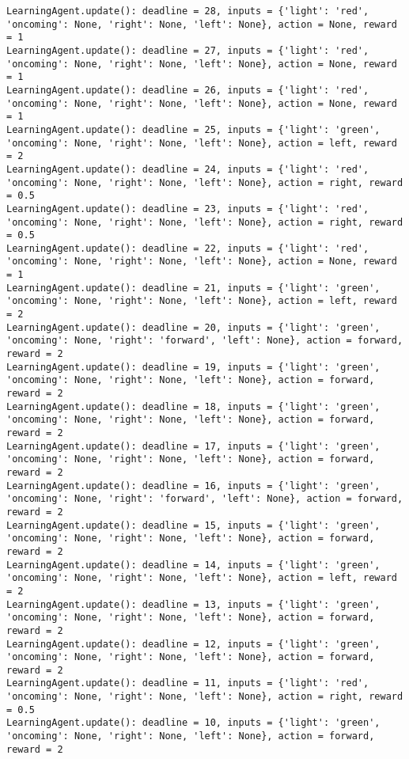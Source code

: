 \documentclass{article}
\begin{document}
\begin{verbatim}
LearningAgent.update(): deadline = 28, inputs = {'light': 'red', 'oncoming': None, 'right': None, 'left': None}, action = None, reward = 1
LearningAgent.update(): deadline = 27, inputs = {'light': 'red', 'oncoming': None, 'right': None, 'left': None}, action = None, reward = 1
LearningAgent.update(): deadline = 26, inputs = {'light': 'red', 'oncoming': None, 'right': None, 'left': None}, action = None, reward = 1
LearningAgent.update(): deadline = 25, inputs = {'light': 'green', 'oncoming': None, 'right': None, 'left': None}, action = left, reward = 2
LearningAgent.update(): deadline = 24, inputs = {'light': 'red', 'oncoming': None, 'right': None, 'left': None}, action = right, reward = 0.5
LearningAgent.update(): deadline = 23, inputs = {'light': 'red', 'oncoming': None, 'right': None, 'left': None}, action = right, reward = 0.5
LearningAgent.update(): deadline = 22, inputs = {'light': 'red', 'oncoming': None, 'right': None, 'left': None}, action = None, reward = 1
LearningAgent.update(): deadline = 21, inputs = {'light': 'green', 'oncoming': None, 'right': None, 'left': None}, action = left, reward = 2
LearningAgent.update(): deadline = 20, inputs = {'light': 'green', 'oncoming': None, 'right': 'forward', 'left': None}, action = forward, reward = 2
LearningAgent.update(): deadline = 19, inputs = {'light': 'green', 'oncoming': None, 'right': None, 'left': None}, action = forward, reward = 2
LearningAgent.update(): deadline = 18, inputs = {'light': 'green', 'oncoming': None, 'right': None, 'left': None}, action = forward, reward = 2
LearningAgent.update(): deadline = 17, inputs = {'light': 'green', 'oncoming': None, 'right': None, 'left': None}, action = forward, reward = 2
LearningAgent.update(): deadline = 16, inputs = {'light': 'green', 'oncoming': None, 'right': 'forward', 'left': None}, action = forward, reward = 2
LearningAgent.update(): deadline = 15, inputs = {'light': 'green', 'oncoming': None, 'right': None, 'left': None}, action = forward, reward = 2
LearningAgent.update(): deadline = 14, inputs = {'light': 'green', 'oncoming': None, 'right': None, 'left': None}, action = left, reward = 2
LearningAgent.update(): deadline = 13, inputs = {'light': 'green', 'oncoming': None, 'right': None, 'left': None}, action = forward, reward = 2
LearningAgent.update(): deadline = 12, inputs = {'light': 'green', 'oncoming': None, 'right': None, 'left': None}, action = forward, reward = 2
LearningAgent.update(): deadline = 11, inputs = {'light': 'red', 'oncoming': None, 'right': None, 'left': None}, action = right, reward = 0.5
LearningAgent.update(): deadline = 10, inputs = {'light': 'green', 'oncoming': None, 'right': None, 'left': None}, action = forward, reward = 2

\end{verbatim}
\end{document}
